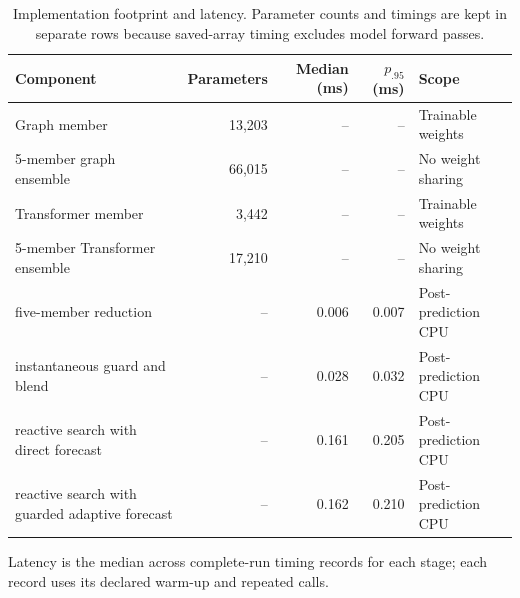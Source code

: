 \begin{table}[!htbp]
\centering
\caption{Implementation footprint and latency. Parameter counts and timings are kept in separate rows because saved-array timing excludes model forward passes.}
\label{tab:r3-runtime-parameters}
\small
\setlength{\tabcolsep}{4.2pt}
\renewcommand{\arraystretch}{1.08}
\begin{tabular}{lrrrl}
\toprule
Component & Parameters & Median (ms) & $p_{.95}$ (ms) & Scope \\
\midrule
Graph member & 13,203 & -- & -- & Trainable weights \\
5-member graph ensemble & 66,015 & -- & -- & No weight sharing \\
Transformer member & 3,442 & -- & -- & Trainable weights \\
5-member Transformer ensemble & 17,210 & -- & -- & No weight sharing \\
five-member reduction & -- & 0.006 & 0.007 & Post-prediction CPU \\
instantaneous guard and blend & -- & 0.028 & 0.032 & Post-prediction CPU \\
reactive search with direct forecast & -- & 0.161 & 0.205 & Post-prediction CPU \\
reactive search with guarded adaptive forecast & -- & 0.162 & 0.210 & Post-prediction CPU \\
\bottomrule
\end{tabular}
\par\vspace{2pt}\footnotesize Latency is the median across complete-run timing records for each stage; each record uses its declared warm-up and repeated calls.
\end{table}

